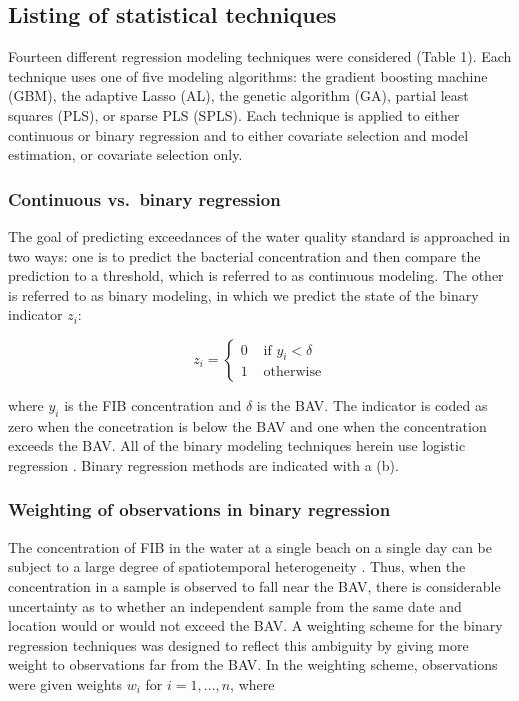 \documentclass[authoryear,review, 12pt]{elsarticle}
\begin{document}
\subsection{Listing of statistical
techniques}\label{listing-of-statistical-techniques}

Fourteen different regression modeling techniques were considered (Table
1). Each technique uses one of five modeling algorithms: the gradient
boosting machine (GBM), the adaptive Lasso (AL), the genetic algorithm
(GA), partial least squares (PLS), or sparse PLS (SPLS). Each technique
is applied to either continuous or binary regression and to either
covariate selection and model estimation, or covariate selection only.

\subsubsection{Continuous vs.~binary
regression}\label{continuous-vs.binary-regression}

The goal of predicting exceedances of the water quality standard is
approached in two ways: one is to predict the bacterial concentration
and then compare the prediction to a threshold, which is referred to as
continuous modeling. The other is referred to as binary modeling, in
which we predict the state of the binary indicator \(z_{i}\):

\[ z_{i}=\left\{ \begin{array}{cl}
0 & \text{ if } y_{i} < \delta\\
1 & \text{ otherwise}
\end{array}\right. \]

where \(y_i\) is the FIB concentration and \(\delta\) is the BAV. The
indicator is coded as zero when the concetration is below the BAV and
one when the concentration exceeds the BAV. All of the binary modeling
techniques herein use logistic regression \citep{Hosmer-Lemeshow-2004}.
Binary regression methods are indicated with a (b).

\subsubsection{Weighting of observations in binary
regression}\label{weighting-of-observations-in-binary-regression}

The concentration of FIB in the water at a single beach on a single day
can be subject to a large degree of spatiotemporal heterogeneity
\citep{Whitman:2004pc}. Thus, when the concentration in a sample is
observed to fall near the BAV, there is considerable uncertainty as to
whether an independent sample from the same date and location would or
would not exceed the BAV. A weighting scheme for the binary regression
techniques was designed to reflect this ambiguity by giving more weight
to observations far from the BAV. In the weighting scheme, observations
were given weights \(w_i\) for \(i=1,\dots,n\), where
\end{document}
